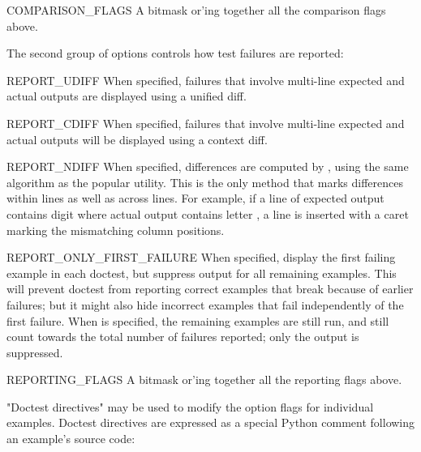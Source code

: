 \begin{datadesc}{COMPARISON_FLAGS}
    A bitmask or'ing together all the comparison flags above.
\end{datadesc}

The second group of options controls how test failures are reported:

\begin{datadesc}{REPORT_UDIFF}
    When specified, failures that involve multi-line expected and
    actual outputs are displayed using a unified diff.
\end{datadesc}

\begin{datadesc}{REPORT_CDIFF}
    When specified, failures that involve multi-line expected and
    actual outputs will be displayed using a context diff.
\end{datadesc}

\begin{datadesc}{REPORT_NDIFF}
    When specified, differences are computed by ,
    using the same algorithm as the popular  utility.
    This is the only method that marks differences within lines as
    well as across lines.  For example, if a line of expected output
    contains digit  where actual output contains letter ,
    a line is inserted with a caret marking the mismatching column
    positions.
\end{datadesc}

\begin{datadesc}{REPORT_ONLY_FIRST_FAILURE}
  When specified, display the first failing example in each doctest,
  but suppress output for all remaining examples.  This will prevent
  doctest from reporting correct examples that break because of
  earlier failures; but it might also hide incorrect examples that
  fail independently of the first failure.  When
   is specified, the remaining
  examples are still run, and still count towards the total number of
  failures reported; only the output is suppressed.
\end{datadesc}

\begin{datadesc}{REPORTING_FLAGS}
    A bitmask or'ing together all the reporting flags above.
\end{datadesc}

"Doctest directives" may be used to modify the option flags for
individual examples.  Doctest directives are expressed as a special
Python comment following an example's source code:

